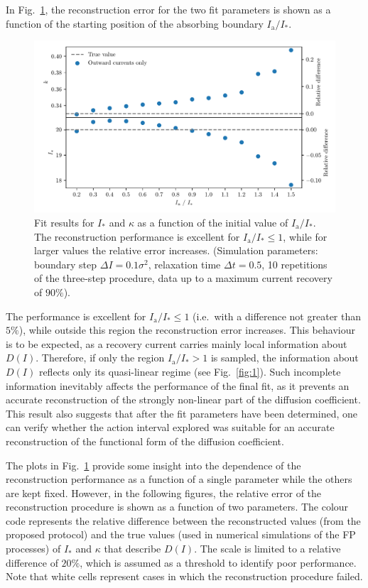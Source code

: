 In Fig.~\ref{fig:different_position}, the reconstruction error for the two fit parameters is shown as a function of the starting position of the absorbing boundary $I_\mathrm{a}/I_\ast$. 
%
\begin{figure}[htp]
    \centering
    \includegraphics[width=\textwidth]{4_probing_the_diffusive_behavior/figs/final/different_position.pdf}
    \caption{Fit results for $I_\ast$ and $\kappa$ as a function of the initial value of $I_\mathrm{a}/I_\ast$. The reconstruction performance is excellent for $I_\mathrm{a}/I_\ast \leq 1$, while for larger values the relative error increases. (Simulation parameters: boundary step $\Delta I=0.1 \sigma^2$, relaxation time $\Delta t=0.5$, 10 repetitions of the three-step procedure, data up to a maximum current recovery of $90\%$).}
    \label{fig:different_position}
\end{figure}
%
The performance is excellent for $I_\mathrm{a}/I_\ast \leq 1$ {(i.e.\ with a difference not greater than $5\%$)}, while outside this region the reconstruction error increases. This behaviour is to be expected, as a recovery current carries mainly local information about $D(I)$. Therefore, if only the region $I_\mathrm{a}/I_\ast > 1$ is sampled, the information about $D(I)$ reflects only its quasi-linear regime (see Fig.~\ref{fig:1}). Such incomplete information inevitably affects the performance of the final fit, as it prevents an accurate reconstruction of the strongly non-linear part of the diffusion coefficient. This result also suggests that after the fit parameters have been determined, one can verify whether the action interval explored was suitable for an accurate reconstruction of the functional form of the diffusion coefficient.

The plots in Fig.~\ref{fig:different_position} provide some insight into the dependence of the reconstruction performance as a function of a single parameter while the others are kept fixed. However, in the following figures, the relative error of the reconstruction procedure is shown as a function of two parameters. The colour code represents the relative difference between the reconstructed values (from the proposed protocol) and the true values (used in numerical simulations of the FP processes) of $I_\ast$ and $\kappa$ that describe $D(I)$. The scale is limited to a relative difference of $20\%$, which is assumed as a threshold to identify poor performance. Note that white cells represent cases in which the reconstruction procedure failed.

